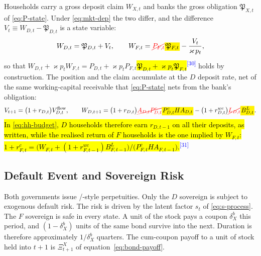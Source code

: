 \documentclass[11pt]{article}
\newcommand{\A}[1]{\hl{#1}}
\newcommand{\D}[1]{{\color{red}\st{#1}}}
\newcommand{\Am}[1]{\mathchoice
  {{\setlength{\fboxsep}{1pt}\colorbox{yellow}{$\displaystyle #1$}}}
  {{\setlength{\fboxsep}{1pt}\colorbox{yellow}{$\textstyle #1$}}}
  {{\setlength{\fboxsep}{1pt}\colorbox{yellow}{$\scriptstyle #1$}}}
  {{\setlength{\fboxsep}{1pt}\colorbox{yellow}{$\scriptscriptstyle #1$}}}}
\newcommand{\Dm}[1]{{\color{red}\cancel{#1}}}
\newcommand{\chg}[1]{\textsuperscript{\textcolor{blue}{\scriptsize[#1]}}}
\begin{document}
Households carry a gross deposit claim $W_{X,t}$ and banks the gross obligation
$\mathfrak{P}_{X,t}$ of \eqref{eq:P-state}. Under \eqref{eq:mkt-dep} the two differ, and the
difference $V_t\equiv W_{D,t}-\mathfrak{P}_{D,t}$ is a state variable:
\begin{equation}
W_{D,t}=\mathfrak{P}_{D,t}+V_t,
\qquad
W_{F,t}=\Dm{P_{F,t}}\Am{\mathfrak{P}_{F,t}}-\frac{V_t}{\varkappa\,p_t},
\label{eq:union-wealth}
\end{equation}
so that $W_{D,t}+\varkappa p_t W_{F,t}=$\D{$P_{D,t}+\varkappa p_t P_{F,t}$}\A{$\mathfrak{P}_{D,t}+\varkappa p_t\mathfrak{P}_{F,t}$}\chg{30} holds by
construction. The position and the claim accumulate at the $D$ deposit rate, net
of the same working-capital receivable that \eqref{eq:P-state} nets from the
bank's obligation:
\begin{equation}
V_{t+1}=\bigl(1+r_{D,t}\bigr)V^{\rm flow}_{D,t},
\qquad
W_{D,t+1}=\bigl(1+r_{D,t}\bigr)\Dm{A_{D,t}P^{c}_{D,t}}\Am{P^{c}_{D,t}HA_{D,t}}
           -\bigl(1+r^{wc}_{D,t}\bigr)\Dm{L_{D,t}}\Am{B^{L}_{D,t}}.
\label{eq:V-lom}
\end{equation}
\A{In {\eqref{eq:hh-budget}}, $D$ households therefore earn $r_{D,t-1}$ on all their deposits, as written, while the realised return of $F$ households is the one implied by $W_{F,t}$: $1+r^{c}_{F,t}=\bigl(W_{F,t}+(1+r^{wc}_{F,t-1})B^{L}_{F,t-1}\bigr)/\bigl(P^{c}_{F,t}HA_{F,t-1}\bigr)$.}\chg{31}

\subsection{Default Event and Sovereign Risk}
\label{sec:default}

Both governments issue \cite{Hatchondo2009}/\cite{Chatterjee2011}-style perpetuities. Only the $D$ sovereign is subject to exogenous default risk. The risk is driven by the latent factor $s_t$ of \eqref{eq:s-process}. The $F$ sovereign is safe in every state. A unit of the stock pays a coupon $\delta_{X}^b$ this period, and $(1-\delta_{X}^b)$ units of the same bond survive into the next. Duration is therefore approximately $1/\delta_{X}^b$ quarters. The cum-coupon payoff to a unit of stock held into $t+1$ is $\Xi_{t+1}^X$ of equation~\eqref{eq:bond-payoff}.
\end{document}
